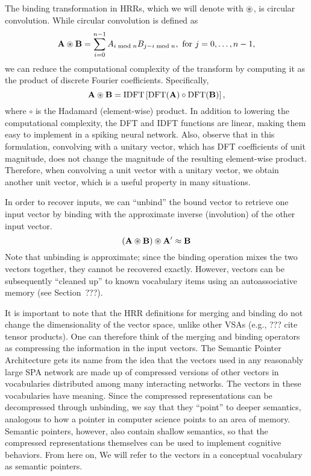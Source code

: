 {The binding transformation in HRRs,
which we will denote with $\circledast$,
is circular convolution.
While circular convolution
is defined as
\begin{equation}
  \mathbf{A} \circledast \mathbf{B} = \sum_{i=0}^{n-1} A_{i \bmod n}B_{j-i \bmod n},
    \text{ for } j=0, \ldots, n-1,
\end{equation}
we can reduce the computational complexity
of the transform
by computing it as the
product of discrete Fourier coefficients.
Specifically,
\begin{equation}
  \mathbf{A} \circledast \mathbf{B} = \text{IDFT}\left[
    \text{DFT}(\mathbf{A}) \circ \text{DFT}(\mathbf{B})\right],
\end{equation}
where $\circ$ is the Hadamard (element-wise) product.
In addition to lowering
the computational complexity,
the DFT and IDFT functions are linear,
making them easy to implement
in a spiking neural network.
Also, observe that in this formulation,
convolving with a unitary vector,
which has DFT coefficients of unit magnitude,
does not change the magnitude
of the resulting element-wise product.
Therefore, when convolving a unit vector
with a unitary vector,
we obtain another unit vector,
which is a useful property
in many situations.

In order to recover inputs,
we can ``unbind'' the bound vector
to retrieve one input vector
by binding with the approximate inverse (involution)
of the other input vector.
\begin{equation}
  (\mathbf{A} \circledast \mathbf{B}) \circledast \mathbf{A'} \approx \mathbf{B}
\end{equation}
Note that unbinding is approximate;
since the binding operation
mixes the two vectors together,
they cannot be recovered exactly.
However, vectors can be subsequently
``cleaned up'' to known
vocabulary items using an autoassociative memory
(see Section~???).

It is important to note that
the HRR definitions for merging and binding
do not change the dimensionality
of the vector space, unlike other VSAs
(e.g., ??? cite tensor products).
One can therefore think of the
merging and binding operators
as compressing the information
in the input vectors.
The Semantic Pointer Architecture
gets its name from the idea that
the vectors used
in any reasonably large SPA network
are made up of compressed versions
of other vectors in vocabularies
distributed among many interacting networks.
The vectors in these vocabularies
have meaning.
Since the compressed representations
can be decompressed through unbinding,
we say that they ``point''
to deeper semantics,
analogous to how a pointer in computer science
points to an area of memory.
Semantic pointers, however,
also contain shallow semantics,
so that the compressed
representations themselves
can be used to implement cognitive behaviors.
From here on, We will refer to
the vectors in a conceptual vocabulary
as semantic pointers.

}
